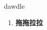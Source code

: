 
\begin{frame}
{\huge dawdle}
\begin{center}
\begin{enumerate}\Large
  \item \textbf{拖拖拉拉}
\end{enumerate}
\end{center}
\end{frame}
